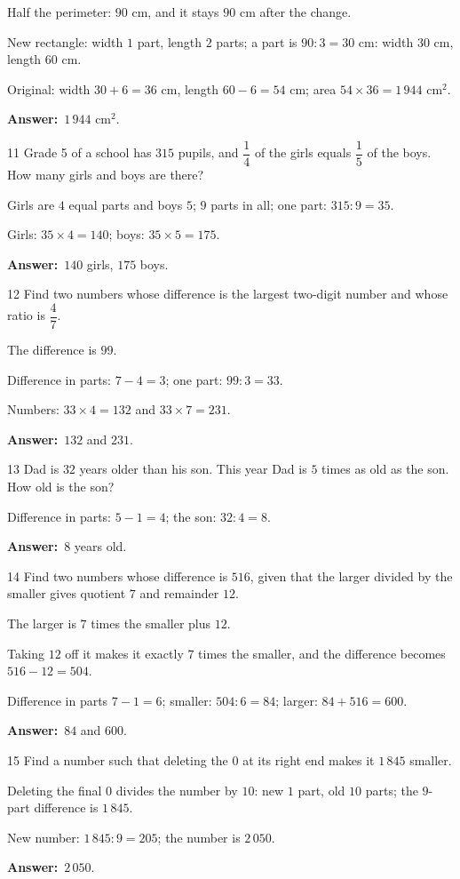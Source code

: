 \documentclass[11pt]{article}
\newif\ifsol \solfalse
\providecommand{\AnsWord}{Đáp số}
\newcommand{\dapso}[1]{\par\textbf{\AnsWord:}\ #1}
\newcommand{\probsol}[1]{%
  \begin{lrbox}{\solmeasure}\begin{minipage}{\dimexpr\linewidth-24pt\relax}#1\end{minipage}\end{lrbox}%
  \ifsol
    \begin{solbox}#1\end{solbox}%
  \else
    \setlength{\solht}{\dimexpr\ht\solmeasure+\dp\solmeasure+0.85cm\relax}%
    \ifdim\solht<1.35cm\setlength{\solht}{1.35cm}\fi
    \begin{tcolorbox}[colback=white,colframe=Line,boxrule=0.8pt,arc=5pt,
      left=8pt,right=8pt,top=4pt,bottom=4pt,height=\solht]{\footnotesize\color{Slate}\itshape\WorkWord}\end{tcolorbox}%
  \fi}
\newcommand{\gap}{\vspace{0.3cm}}
\def\WorkWord{Your work:}
\def\AnsWord{Answer}
\begin{document}
\probsol{
Half the perimeter: $90$ cm, and it stays $90$ cm after the change.\par
New rectangle: width $1$ part, length $2$ parts; a part is $90:3=30$ cm: width $30$ cm, length $60$ cm.\par
Original: width $30+6=36$ cm, length $60-6=54$ cm; area $54\times36=1\,944$ cm$^2$.
\dapso{$1\,944$ cm$^2$.}}
\gap
\begin{probbox}{11}{\relax}
Grade 5 of a school has $315$ pupils, and $\dfrac14$ of the girls equals $\dfrac15$ of the boys. How many girls and boys are there?
\end{probbox}
\probsol{
Girls are $4$ equal parts and boys $5$; $9$ parts in all; one part: $315:9=35$.\par
Girls: $35\times4=140$; boys: $35\times5=175$.
\dapso{$140$ girls, $175$ boys.}}
\gap
\begin{probbox}{12}{\relax}
Find two numbers whose difference is the largest two-digit number and whose ratio is $\dfrac47$.
\end{probbox}
\probsol{
The difference is $99$.\par Difference in parts: $7-4=3$; one part: $99:3=33$.\par Numbers: $33\times4=132$ and $33\times7=231$.
\dapso{$132$ and $231$.}}
\gap
\begin{probbox}{13}{\relax}
Dad is $32$ years older than his son. This year Dad is $5$ times as old as the son. How old is the son?
\end{probbox}
\probsol{
Difference in parts: $5-1=4$; the son: $32:4=8$.
\dapso{$8$ years old.}}
\gap
\begin{probbox}{14}{\relax}
Find two numbers whose difference is $516$, given that the larger divided by the smaller gives quotient $7$ and remainder $12$.
\end{probbox}
\probsol{
The larger is $7$ times the smaller plus $12$.\par Taking $12$ off it makes it exactly $7$ times the smaller, and the difference becomes $516-12=504$.\par
Difference in parts $7-1=6$; smaller: $504:6=84$; larger: $84+516=600$.
\dapso{$84$ and $600$.}}
\gap
\begin{probbox}{15}{\relax}
Find a number such that deleting the $0$ at its right end makes it $1\,845$ smaller.
\end{probbox}
\probsol{
Deleting the final $0$ divides the number by $10$: new $1$ part, old $10$ parts; the $9$-part difference is $1\,845$.\par
New number: $1\,845:9=205$; the number is $2\,050$.
\dapso{$2\,050$.}}
\end{document}
